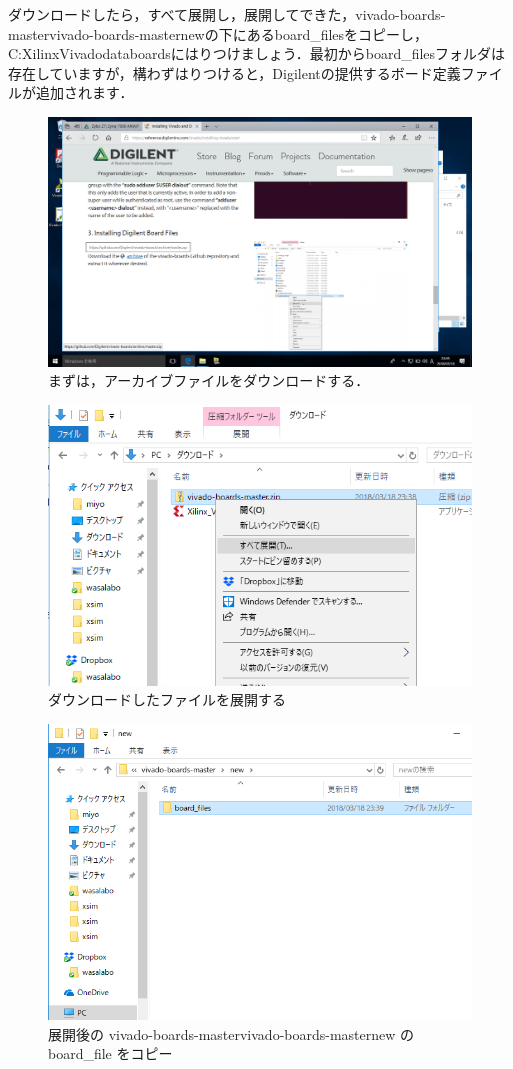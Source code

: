 \documentclass[a4paper,dvipdfmx]{jsarticle}
\begin{document}
ダウンロードしたら，すべて展開し，展開してできた，vivado-boards-master\yen vivado-boards-master\yen newの下にあるboard\_filesをコピーし，C:\yen Xilinx\yen Vivado\yen data\yen boardsにはりつけましょう．最初からboard\_filesフォルダは存在していますが，構わずはりつけると，Digilentの提供するボード定義ファイルが追加されます．

 \begin{figure}[H]
  \begin{center}
   \includegraphics[width=.8\textwidth]{appendix_figures/19_download_archive.png}
  \end{center}
   \caption{まずは，アーカイブファイルをダウンロードする．}
 \end{figure}
 \begin{figure}[H]
  \begin{center}
   \includegraphics[width=.6\textwidth]{appendix_figures/20_extract_archive.png}
  \end{center}
   \caption{ダウンロードしたファイルを展開する}
 \end{figure}
 \begin{figure}[H]
  \begin{center}
   \includegraphics[width=.6\textwidth]{appendix_figures/21_board_file.png}
  \end{center}
  \caption{展開後の vivado-boards-master\yen vivado-boards-master\yen new の board\_file をコピー}
 \end{figure}
\end{document}

